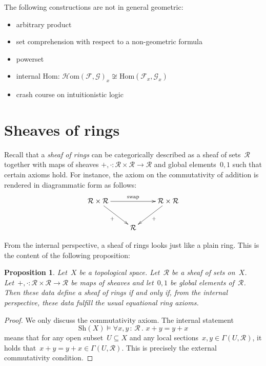 \documentclass[10pt]{amsart}
\theoremstyle{definition}
\theoremstyle{plain}
\newtheorem{prop}[defn]{Proposition}
\theoremstyle{remark}
\newcommand{\F}{\mathcal{F}}
\newcommand{\G}{\mathcal{G}}
\newcommand{\R}{\mathcal{R}}
\newcommand{\Hom}{\mathrm{Hom}}
\newcommand{\HOM}{\mathcal{H}\mathrm{om}}
\newcommand{\Sh}{\mathrm{Sh}}
\newcommand{\?}{\,{:}\,}
\renewcommand{\_}{\mathpunct{.}\,}
\begin{document}
The following constructions are not in general geometric:
\begin{itemize}
\item arbitrary product
\item set comprehension with respect to a non-geometric formula
\item powerset
\item internal Hom: $\HOM(\F,\G)_x \not\cong \Hom(\F_x,\G_x)$
\end{itemize}

\begin{itemize}
\item crash course on intuitionistic logic
\end{itemize}


\section{Sheaves of rings}

Recall that a \emph{sheaf of rings} can be categorically described as a
sheaf of sets~$\R$ together with maps of sheaves $+, \cdot : \R \times \R \to
\R$ and global elements~$0, 1$ such that certain axioms hold. For instance, the
axiom on the commutativity of addition is rendered in diagrammatic form as
follows:
\[ \xymatrix{
  \R \times \R \ar[rr]^{\mathrm{swap}} \ar[rd]_{+} && \R \times \R \ar[ld]^{+} \\
  & \R
} \]

From the internal perspective, a sheaf of rings looks just like a plain ring.
This is the content of the following proposition:

\begin{prop}\label{prop:rings-internally}
Let~$X$ be a topological space. Let~$\R$ be a sheaf of sets on~$X$.
Let~$+, \cdot : \R \times \R \to \R$ be maps of sheaves and let~$0, 1$ be
global elements of~$\R$. Then these data define a sheaf of rings if and only
if, from the internal perspective, these data fulfill the usual equational ring
axioms.\end{prop}
\begin{proof}We only discuss the commutativity axiom. The internal statement
\[ \Sh(X) \models \forall x,y\?\R\_ x + y = y + x \]
means that for any open subset~$U \subseteq X$ and any local sections~$x,y \in
\Gamma(U,\R)$, it holds that~$x + y = y + x \in \Gamma(U,\R)$. This is
precisely the external commutativity condition.
\end{proof}
\end{document}
